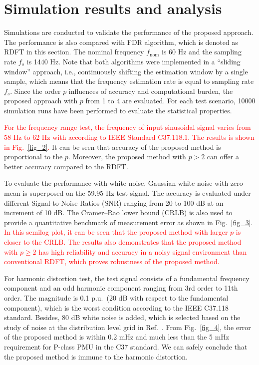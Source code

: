 \documentclass[journal,twoside]{IEEEtran}
\begin{document}
\section{Simulation results and analysis}
Simulations are conducted to validate the performance of the proposed approach. The performance is also compared with FDR algorithm\cite{chenjian,7265090}, which is denoted as RDFT in this section. The nominal frequency $f_\mathrm{nom}$ is 60 Hz and the sampling rate $f_s$ is 1440 Hz. Note that both algorithms were implemented in a “sliding window” approach, i.e., continuously shifting the estimation window by a single sample, which means that the frequency estimation rate is equal to sampling rate $f_s$. Since the order $p$ influences of accuracy and computational burden, the proposed approach with $p$ from 1 to 4 are evaluated. For each test scenario, 10000 simulation runs have been performed to evaluate the statistical properties.

\textcolor{red}{For the frequency range test, the  frequency of  input sinusoidal signal  varies from 58 Hz to 62 Hz with according to IEEE Standard C37.118.1. The results is shown in Fig.~\ref{fig_2}.} It can be seen that accuracy of the proposed method is proportional to the $p$. Moreover, the proposed method with  $p>2$ can offer a better accuracy compared to the RDFT.

To evaluate the performance with white noise, Gaussian white noise with zero mean is superposed on the 59.95 Hz test signal. The accuracy is evaluated under different Signal-to-Noise Ratios (SNR) ranging from 20 to 100 dB at an increment of 10 dB. The Cramer–Rao lower bound (CRLB) is also used to provide a quantitative benchmark of measurement error as shown in Fig.~\ref{fig_3}. \textcolor{red}{In this semilog plot, it can be seen that the proposed method with larger $p$ is closer to the CRLB. The results also  demonstrates that the  proposed method with $p\geq2$ has high reliability and accuracy in a noisy signal environment than conventional RDFT, which proves robustness of the proposed method.}

For harmonic distortion test, the test signal consists of a fundamental frequency component and an odd harmonic component ranging from 3rd order  to 11th order. The magnitude is 0.1 p.u.~(20 dB with respect to the fundamental component), which is the worst condition according to the IEEE  C37.118 standard\cite{c37}. Besides, 80 dB white noise is added, which is selected based on the study of noise at the distribution level grid in Ref.~\cite{7051271}. From Fig.~\ref{fig_4}, the error of the proposed method is within 0.2 mHz and much less than the 5 mHz requirement for P-class PMU in the C37 standard. We can safely conclude that the proposed method is immune to the harmonic distortion.
\end{document}
